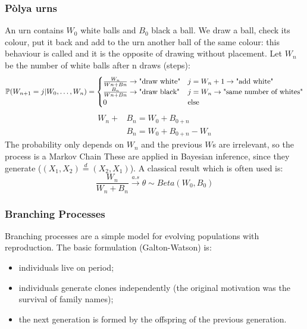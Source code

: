 \documentclass{article}
\begin{document}
	\subsubsection*{Pòlya urns}
	An urn contains $W_0$ white balls and $B_0$ black a ball. We draw a ball, check its colour, put it back and add to the urn another ball of the same colour: this behaviour is called  and it is the opposite of drawing without placement. Let $W_n$ be the number of white balls after n draws (steps):
	\[
	\mathbb{P}(W_{n+1}=j|W_0,\ldots,W_n)=\begin{cases}
		\frac{W_n}{Wn+Bn}\rightarrow\text{"draw white"} &j=W_n+1\rightarrow\text{"add white"}\\
		\frac{B_n}{Wn+Bn}\rightarrow\text{"draw black"} &j=W_n\rightarrow\text{"same number of whites"}\\
		0 & \text{else}
	\end{cases}
	\]
	\begin{align*}
		W_n+&B_n=W_0+B_{0+n}\\
		&B_n=W_0+B_{0+n}-W_n
	\end{align*}
	The probability only depends on $W_n$ and the previous $W$s are irrelevant, so the process is a Markov Chain
	These are applied in Bayesian inference, since they generate  ($(X_1, X_2)\stackrel{d}{=}(X_2,X_1)$). A classical result which is often used is:
	\[
	\frac{W_n}{W_n+B_n}\xrightarrow{a.s}\theta\sim Beta(W_0, B_0)
	\]
	\subsubsection*{Branching Processes}
	Branching processes are a simple model for evolving populations with reproduction. The basic formulation (Galton-Watson) is:
	\begin{itemize}
		\item individuals live on period;
		\item individuals generate clones independently (the original motivation was the survival of family names);
		\item the next generation is formed by the offspring of the previous generation.
	\end{itemize}
	
\end{document}
